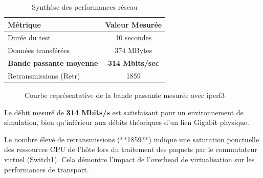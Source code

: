 \documentclass[11pt,a4paper,oneside]{report}
\begin{document}
\begin{table}[h!]
\centering
\begin{tabular}{|l|c|}
\hline
\textbf{M\'{e}trique} & \textbf{Valeur Mesur\'{e}e} \\ \hline
Dur\'{e}e du test & 10 secondes \\ \hline
Donn\'{e}es transf\'{e}r\'{e}es & 374 MBytes \\ \hline
\textbf{Bande passante moyenne} & \textbf{314 Mbits/sec} \\ \hline
Retransmissions (Retr) & 1859 \\ \hline
\end{tabular}
\caption{Synth\`{e}se des performances r\'{e}seau}
\label{tab:resultats_performance}
\end{table}
\begin{figure}[h!]
    \centering
    \caption{Courbe représentative de la bande passante mesurée avec iperf3}
    \label{fig:graphique_iperf}
\end{figure}

\begin{tcolorbox}[defbox, title={Interpr\'{e}tation des donn\'{e}es}]
Le d\'{e}bit mesur\'{e} de \textbf{314 Mbits/s} est satisfaisant pour un environnement de simulation, bien qu'inf\'{e}rieur aux d\'{e}bits th\'{e}oriques d'un lien Gigabit physique. 

Le nombre \'{e}lev\'{e} de retransmissions (**1859**) indique une saturation ponctuelle des ressources CPU de l'hôte lors du traitement des paquets par le commutateur virtuel (Switch1). Cela d\'{e}montre l'impact de l'overhead de virtualisation sur les performances de transport.
\end{tcolorbox}
\end{document}
